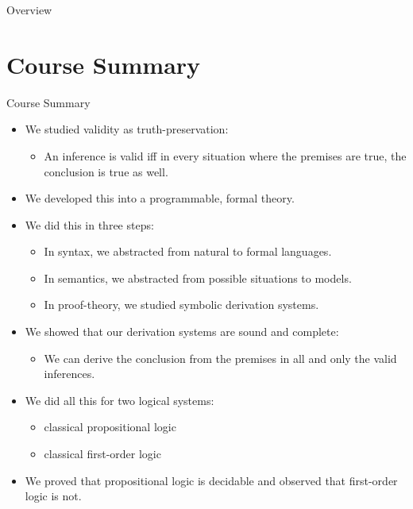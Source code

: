 \begin{frame}
	\maketitle
\end{frame}

\begin{frame}{Overview}
  \setcounter{framenumber}{352}
  \tableofcontents
\end{frame}

\section{Course Summary}
\begin{frame}{Course Summary}

  \small
  \begin{itemize}

    \item We studied validity as truth-preservation:
      \begin{itemize}
      \item An inference is valid iff in every situation where the
        premises are true, the conclusion is true as well.
      \end{itemize}
      \item We developed this into a programmable, formal theory.
      \item We did this in three steps:
        \begin{itemize}
        \item In syntax, we abstracted from natural to formal
          languages.
        \item In semantics, we abstracted from possible situations to models.
          
            \item In proof-theory, we studied symbolic derivation systems.
            \end{itemize}
              \item We showed that our derivation systems are sound
                and complete:
                \begin{itemize}
                \item We can derive the conclusion from the premises
                  in all and only the valid inferences.
                \end{itemize}
                \item We did all this for two logical systems:
            \begin{itemize}
            \item classical propositional logic
              \item classical first-order logic
              \end{itemize}
                \item We proved that propositional logic is decidable
                  and observed that first-order logic is not.
										
	\end{itemize}

\end{frame}

